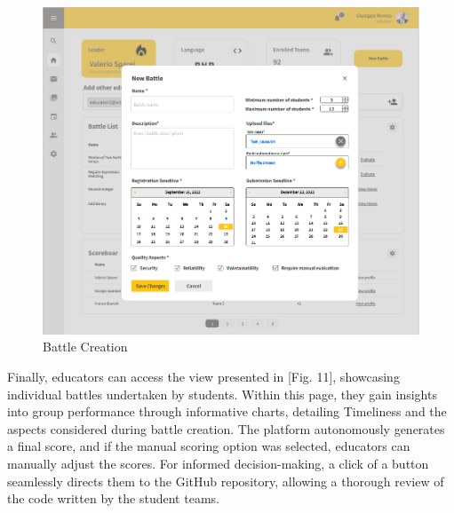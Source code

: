 \documentclass[12pt,oneside,a4paper]{article}
\begin{document}
\begin{figure}[htbp]
    \centering
    \includegraphics[width=1\linewidth]{Images/Interfaces/Educator Interfaces/BattleCreation.PNG}
    \caption{Battle Creation}
    \label{fig:enter-label}
\end{figure}

\pagebreak

\begin{flushleft}
Finally, educators can access the view presented in [Fig. 11], showcasing individual battles undertaken by students. Within this page, they gain insights into group performance through informative charts, detailing Timeliness and the aspects considered during battle creation. The platform autonomously generates a final score, and if the manual scoring option was selected, educators can manually adjust the scores. For informed decision-making, a click of a button seamlessly directs them to the GitHub repository, allowing a thorough review of the code written by the student teams.    
\end{flushleft}
\end{document}
